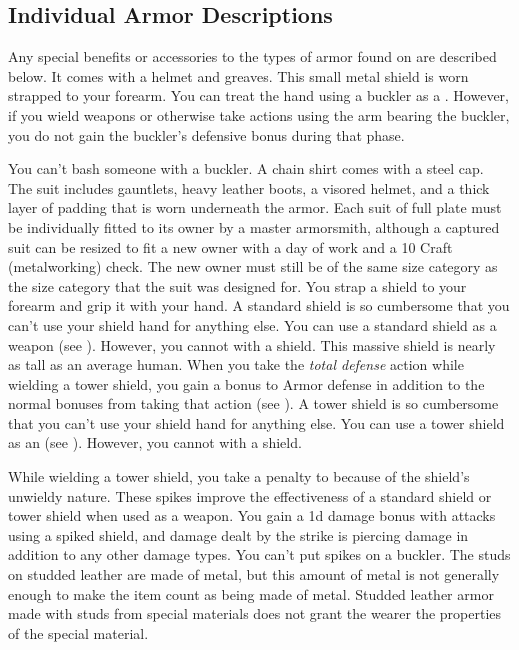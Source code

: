     \subsection{Individual Armor Descriptions}
        Any special benefits or accessories to the types of armor found on  are described below.
         It comes with a helmet and greaves.
         This small metal shield is worn strapped to your forearm.
        You can treat the hand using a buckler as a .
        However, if you wield weapons or otherwise take actions using the arm bearing the buckler, you do not gain the buckler's defensive bonus during that phase.
        \par You can't bash someone with a buckler.
         A chain shirt comes with a steel cap.
         The suit includes gauntlets, heavy leather boots, a visored helmet, and a thick layer of padding that is worn underneath the armor. Each suit of full plate must be individually fitted to its owner by a master armorsmith, although a captured suit can be resized to fit a new owner with a day of work and a  10 Craft (metalworking) check. The new owner must still be of the same size category as the size category that the suit was designed for.
         You strap a shield to your forearm and grip it with your hand.
        A standard shield is so cumbersome that you can't use your shield hand for anything else.
        You can use a standard shield as a weapon (see ).
        However, you cannot  with a shield.
         This massive shield is nearly as tall as an average human.
        When you take the \textit{total defense} action while wielding a tower shield, you gain a  bonus to Armor defense in addition to the normal bonuses from taking that action (see ).
        A tower shield is so cumbersome that you can't use your shield hand for anything else.
        You can use a tower shield as an  (see ).
        However, you cannot  with a shield.

        While wielding a tower shield, you take a  penalty to  because of the shield's unwieldy nature.
         These spikes improve the effectiveness of a standard shield or tower shield when used as a weapon.
        You gain a \plus1d damage bonus with attacks using a spiked shield, and damage dealt by the strike is piercing damage in addition to any other damage types.
        You can't put spikes on a buckler.
         The studs on studded leather are made of metal, but this amount of metal is not generally enough to make the item count as being made of metal.
        Studded leather armor made with studs from special materials does not grant the wearer the properties of the special material.

